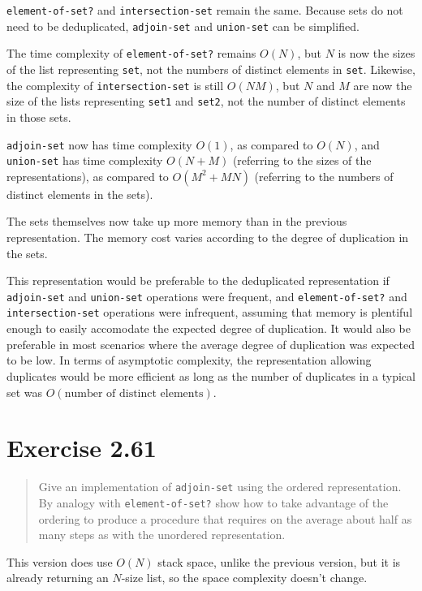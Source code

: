 \documentclass{article}
\begin{document}
\texttt{element-of-set?} and \texttt{intersection-set} remain the same. Because
sets do not need to be deduplicated, \texttt{adjoin-set} and \texttt{union-set}
can be simplified.




The time complexity of \texttt{element-of-set?} remains $O(N)$, but $N$ is now
the sizes of the list representing \texttt{set}, not the numbers of distinct
elements in \texttt{set}. Likewise, the complexity of \texttt{intersection-set}
is still $O(NM)$, but $N$ and $M$ are now the size of the lists representing
\texttt{set1} and \texttt{set2}, not the number of distinct elements in those
sets.

\texttt{adjoin-set} now has time complexity $O(1)$, as compared to $O(N)$, and
\texttt{union-set} has time complexity $O(N+M)$ (referring to the sizes of the
representations), as compared to $O(M^2 + MN)$ (referring to the numbers of
distinct elements in the sets).

The sets themselves now take up more memory than in the previous representation.
The memory cost varies according to the degree of duplication in the sets.

This representation would be preferable to the deduplicated representation if
\texttt{adjoin-set} and \texttt{union-set} operations were frequent, and
\texttt{element-of-set?} and \texttt{intersection-set} operations were
infrequent, assuming that memory is plentiful enough to easily accomodate the
expected degree of duplication. It would also be preferable in most scenarios
where the average degree of duplication was expected to be low. In terms of
asymptotic complexity, the representation allowing duplicates would be more
efficient as long as the number of duplicates in a typical set was
$O(\textrm{number of distinct elements})$.

\section{Exercise 2.61}
\begin{quote}
    Give an implementation of \texttt{adjoin-set} using the ordered
    representation. By analogy with \texttt{element-of-set?} show how to take
    advantage of the ordering to produce a procedure that requires on the
    average about half as many steps as with the unordered representation.
\end{quote}



This version does use $O(N)$ stack space, unlike the previous version, but it
is already returning an $N$-size list, so the space complexity doesn't change.
\end{document}
